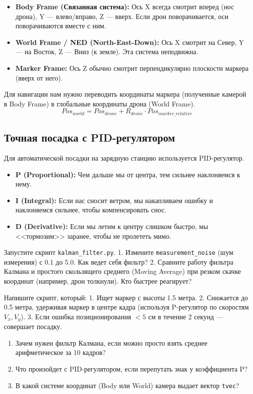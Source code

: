\begin{itemize}
    \item \textbf{Body Frame (Связанная система):} Ось X всегда смотрит вперед (нос дрона), Y — влево/вправо, Z — вверх. Если дрон поворачивается, оси поворачиваются вместе с ним.
    \item \textbf{World Frame / NED (North-East-Down):} Ось X смотрит на Север, Y — на Восток, Z — Вниз (к земле). Эта система неподвижна.
    \item \textbf{Marker Frame:} Ось Z обычно смотрит перпендикулярно плоскости маркера (вверх от него).
\end{itemize}

Для навигации нам нужно переводить координаты маркера (полученные камерой в Body Frame) в глобальные координаты дрона (World Frame).
$$ Pos_{world} = Pos_{drone} + R_{drone} \cdot Pos_{marker\_relative} $$

\subsection{Точная посадка с PID-регулятором}
Для автоматической посадки на зарядную станцию используется PID-регулятор.
\begin{itemize}
    \item \textbf{P (Proportional):} Чем дальше мы от центра, тем сильнее наклоняемся к нему.
    \item \textbf{I (Integral):} Если нас сносит ветром, мы накапливаем ошибку и наклоняемся сильнее, чтобы компенсировать снос.
    \item \textbf{D (Derivative):} Если мы летим к центру слишком быстро, мы <<тормозим>> заранее, чтобы не пролететь мимо.
\end{itemize}

\begin{taskbox}
Запустите скрипт \texttt{kalman\_filter.py}.
1. Измените \texttt{measurement\_noise} (шум измерения) с 0.1 до 5.0. Как ведет себя фильтр?
2. Сравните работу фильтра Калмана и простого скользящего среднего (Moving Average) при резком скачке координат (например, дрон толкнули). Кто быстрее реагирует?
\end{taskbox}

\begin{taskbox}
Напишите скрипт, который:
1. Ищет маркер с высоты 1.5 метра.
2. Снижается до 0.5 метра, удерживая маркер в центре кадра (используя P-регулятор по скоростям $V_x, V_y$).
3. Если ошибка позиционирования $< 5$ см в течение 2 секунд — совершает посадку.
\end{taskbox}

\begin{questionbox}
\begin{enumerate}
    \item Зачем нужен фильтр Калмана, если можно просто взять среднее арифметическое за 10 кадров?
    \item Что произойдет с PID-регулятором, если перепутать знак у коэффициента P?
    \item В какой системе координат (Body или World) камера выдает вектор \texttt{tvec}?
\end{enumerate}
\end{questionbox}
